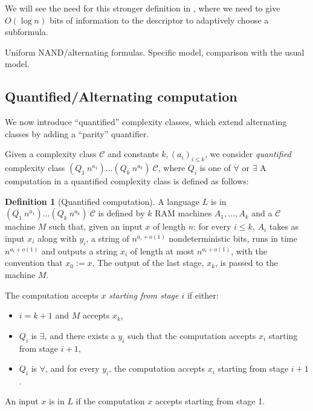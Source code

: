 \documentclass[a4paper, 11pt]{article}
\theoremstyle{plain}
\theoremstyle{definition}
\newtheorem{definition}[theorem]{Definition}
\theoremstyle{remark}
\newcommand{\Cc}{\mathcal{C}}%
\newcommand{\NAND}{\textsf{NAND}}%
\begin{document}
We will see the need for this stronger definition in , 
where we need to give $O(\log n)$ bits of information to the descriptor
to adaptively choose a subformula.

Uniform \NAND{}/alternating formulas. Specific model, comparison with the usual model.

\subsection{Quantified/Alternating computation}

We now introduce ``quantified'' complexity classes, which extend alternating classes 
by adding a ``parity'' quantifier.

Given a complexity class $\Cc$ and constants $k, (a_i)_{i\leq k}$, 
we consider \textit{quantified} complexity
class $(Q_1~n^{a_1})\ldots(Q_k~n^{a_k})~\Cc$, 
where $Q_i$ is one of $\forall$ or $\exists$
A computation in a quantified complexity class is defined as follows:
\begin{definition}[Quantified computation]
	A language $L$ is in $(Q_1~n^{a_1})\ldots(Q_k~n^{a_k})~\Cc$ 
	is defined by $k$ RAM machines $A_1, \ldots, A_k$ and a $\Cc$ machine $M$
	such that, given an input $x$ of length $n$:
	for every $i \le k$, $A_{i}$ takes as input $x_i$ along with $y_i$, 
	a string of $n^{a_{i} + o(1)}$ nondeterministic bits,
	runs in time $n^{a_{i} + o(1)}$ and outputs a string $x_{i}$ of length at most $n^{a_{i} + o(1)}$, 
	with the convention that $x_0 := x$.
	The output of the last stage, $x_{k}$, is passed to the machine $M$. 

	The computation accepts $x$ \textit{starting from stage $i$} if either:
	\begin{itemize}
		\item $i = k+1$ and $M$ accepts $x_{k}$, 
		\item $Q_i$ is $\exists$, and there exists a $y_i$ such that the computation
		accepts $x_{i}$ starting from stage $i+1$, 
		\item $Q_i$ is $\forall$, and for every $y_i$, the computation
		accepts $x_{i}$ starting from stage $i+1$. 
	\end{itemize}

	An input $x$ is in $L$ if the computation $x$ accepts starting from stage 1.
\end{definition}
\end{document}
